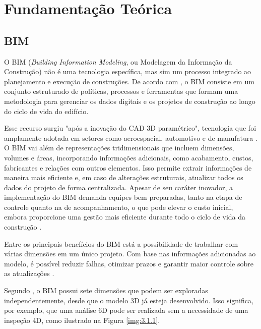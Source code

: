 \chapter{Fundamentação Teórica}

\section {BIM}

O BIM (\textit{Building Information Modeling}, ou Modelagem da Informação da Construção) não é uma tecnologia específica, mas sim um processo integrado ao planejamento e execução de construções. De acordo com , o BIM consiste em um conjunto estruturado de políticas, processos e ferramentas que formam uma metodologia para gerenciar os dados digitais e os projetos de construção ao longo do ciclo de vida do edifício.

Esse recurso surgiu "após a inovação do CAD 3D paramétrico", tecnologia que foi amplamente adotada em setores como aeroespacial, automotivo e de manufatura \cite{monteiro2011}. O BIM vai além de representações tridimensionais que incluem dimensões, volumes e áreas, incorporando informações adicionais, como acabamento, custos, fabricantes e relações com outros elementos. Isso permite extrair informações de maneira mais eficiente e, em caso de alterações estruturais, atualizar todos os dados do projeto de forma centralizada. Apesar de seu caráter inovador, a implementação do BIM demanda equipes bem preparadas, tanto na etapa de controle quanto na de acompanhamento, o que pode elevar o custo inicial, embora proporcione uma gestão mais eficiente durante todo o ciclo de vida da construção \cite{coelho2018}.

Entre os principais benefícios do BIM está a possibilidade de trabalhar com várias dimensões em um único projeto. Com base nas informações adicionadas ao modelo, é possível reduzir falhas, otimizar prazos e garantir maior controle sobre as atualizações \cite{parreira2013}.

Segundo \cite{eastman2011}, o BIM possui sete dimensões que podem ser exploradas independentemente, desde que o modelo 3D já esteja desenvolvido. Isso significa, por exemplo, que uma análise 6D pode ser realizada sem a necessidade de uma inspeção 4D, como ilustrado na Figura \ref{img:3.1.1}.

